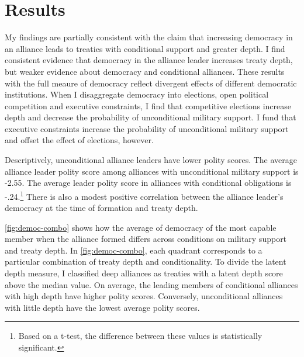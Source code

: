 \documentclass[12pt]{article}
\begin{document}
\section{Results}


My findings are partially consistent with the claim that increasing democracy in an alliance leads to treaties with conditional support and greater depth. 
I find consistent evidence that democracy in the alliance leader increases treaty depth, but weaker evidence about democracy and conditional alliances. 
These results with the full meaure of democracy reflect divergent effects of different democratic institutions. 
When I disaggregate democracy into elections, open political competition and executive constraints, I find that competitive elections 
increase depth and decrease the probability of unconditional military support.
I fund that executive constraints increase the probability of unconditional military support and offset the effect of elections, however. 


Descriptively, unconditional alliance leaders have lower polity scores.
The average alliance leader polity score among alliances with unconditional military support is -2.55. 
The average leader polity score in alliances with conditional obligations is -.24.\footnote{Based on a t-test, the difference between these values is statistically significant.} 
There is also a modest positive correlation between the alliance leader's democracy at the time of formation and treaty depth. 


\autoref{fig:democ-combo} shows how the average of democracy of the most capable  member when the alliance formed differs across conditions on military support and treaty depth.
In \autoref{fig:democ-combo}, each quadrant corresponds to a particular combination of treaty depth and conditionality. 
To divide the latent depth measure, I classified deep alliances as treaties with a latent depth score above the median value. 
On average, the leading members of conditional alliances with high depth have higher polity scores. 
Conversely, unconditional alliances with little depth have the lowest average polity scores. 
\end{document}
